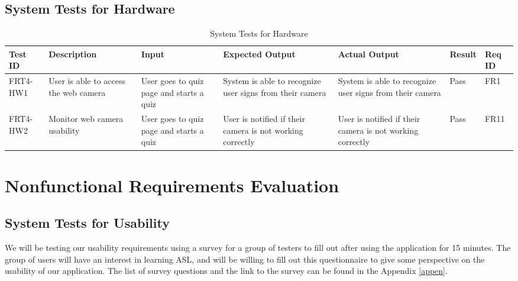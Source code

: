 \documentclass[12pt, titlepage]{article}
\begin{document}
\subsection{System Tests for Hardware}
\begin{longtable}{|p{1cm}|p{2.5cm}|p{2cm}|p{2cm}|p{2cm}|p{1.5cm}|p{1cm}|}
\caption{System Tests for Hardware} \\
\hline
\textbf{Test ID} & \textbf{Description} & \textbf{Input} & \textbf{Expected Output} & \textbf{Actual Output} & \textbf{Result} & \textbf{Req ID}\\
\hline
FRT4-HW1 & User is able to access the web camera & User goes to quiz page and starts a quiz & System is able to recognize user signs from their camera & System is able to recognize user signs from their camera & Pass & FR1 \\
\hline
FRT4-HW2 & Monitor web camera usability & User goes to quiz page and starts a quiz & User is notified if their camera is not working correctly & User is notified if their camera is not working correctly & Pass & FR11 \\
\bottomrule
\end{longtable}

\newpage
\section{Nonfunctional Requirements Evaluation}

\subsection{System Tests for Usability}

We will be testing our usability requirements using a survey for a group of testers to fill out after using the application for 15 minutes. The group of users will have an interest in learning ASL, and will be willing to fill out this questionnaire to give some perspective on the usability of our application. The list of survey questions and the link to the survey can be found in the Appendix \ref{appen}.

\end{document}
